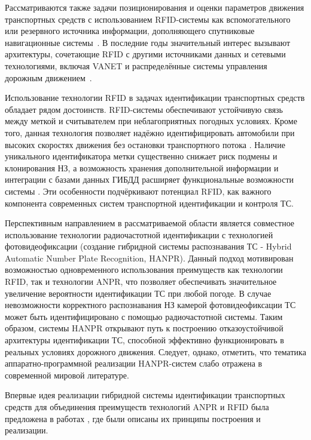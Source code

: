 \documentclass[12pt]{article}
\theoremstyle{definition}
\begin{document}
Рассматриваются также задачи позиционирования и оценки параметров движения транспортных средств с использованием RFID-системы как вспомогательного или резервного источника информации, дополняющего спутниковые навигационные системы~\cite{Yang2024}. В последние годы значительный интерес вызывают архитектуры, сочетающие RFID с другими источниками данных и сетевыми технологиями, включая VANET и распределённые системы управления дорожным движением~\cite{Kamakshi2023}.

Использование технологии RFID в задачах идентификации транспортных средств обладает рядом достоинств. RFID-системы обеспечивают устойчивую связь между меткой и считывателем при неблагоприятных погодных условиях. Кроме того, данная технология позволяет надёжно идентифицировать автомобили при высоких скоростях движения без остановки транспортного потока \cite{Vishn2023, Wang200kmh}. Наличие уникального идентификатора метки существенно снижает риск подмены и клонирования НЗ, а возможность хранения дополнительной информации и интеграции с базами данных ГИБДД расширяет функциональные возможности системы \cite{Finkenzeller}. Эти особенности подчёркивают потенциал RFID, как важного компонента современных систем транспортной идентификации и контроля ТС.

Перспективным направлением в рассматриваемой области является совместное использование технологии радиочастотной идентификации с технологией фотовидеофиксации (создание гибридной системы распознавания ТС - Hybrid Automatic Number Plate Recognition, HANPR). Данный подход мотивирован возможностью одновременного использования преимуществ как технологии RFID, так и технологии ANPR, что позволяет обеспечивать значительное увеличение вероятности идентификации ТС при любой погоде. В случае невозможности корректного распознавания НЗ камерой фотовидеофиксации ТС может быть идентифицировано с помощью радиочастотной системы. Таким образом, системы HANPR открывают путь к построению отказоустойчивой архитектуры идентификации ТС, способной эффективно функционировать в реальных условиях дорожного движения. Следует, однако, отметить, что тематика аппаратно-программной реализации HANPR-систем слабо отражена в современной мировой литературе.

Впервые идея реализации гибридной системы идентификации транспортных средств для объединения преимуществ технологий ANPR и RFID была предложена в работах \cite{VishnevskyMinnikhanov2012rfid, VishnevskyTselikin2012rfid, Vishnevsky2012, Vishn2013}, где были описаны их принципы построения и реализации.
\end{document}
